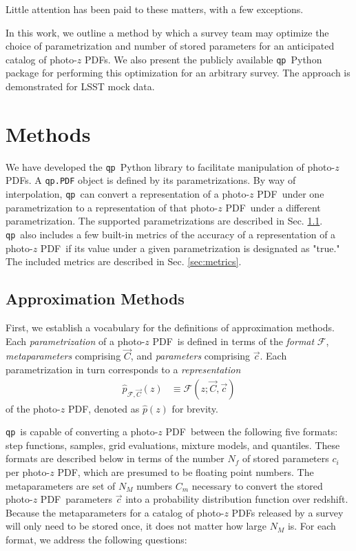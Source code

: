 \documentclass[\docopts]{\docclass}
\newcommand{\qp}{\texttt{qp}}
\newcommand{\pz}{photo-$z$ PDF}
\begin{document}
Little attention has been paid to these matters, with a few exceptions.  
\citep{carrasco_kind_sparse_2014}

In this work, we outline a method by which a survey team may optimize the 
choice of parametrization and number of stored parameters for an anticipated 
catalog of \pz s.  We also present the publicly available \qp\ Python package 
for performing this optimization for an arbitrary survey.  The approach is 
demonstrated for LSST mock data.








\section{Methods}
\label{sec:methods}



We have developed the \qp\ Python library to facilitate manipulation of \pz s.  
A \texttt{qp.PDF} object is defined by its parametrizations.  By way of 
interpolation, \qp\ can convert a representation of a \pz\ under one 
parametrization to a representation of that \pz\ under a different 
parametrization.  The supported parametrizations are described in Sec. 
\ref{sec:approx}.  \qp\ also includes a few built-in metrics of the accuracy of 
a representation of a \pz\ if its value under a given parametrization is 
designated as "true."  The included metrics are described in Sec. 
\ref{sec:metrics}.

\subsection{Approximation Methods}
\label{sec:approx}


First, we establish a vocabulary for the definitions of approximation methods.  
Each \textit{parametrization} of a \pz\ is defined in terms of the 
\textit{format} $\mathcal{F}$, \textit{metaparameters} comprising $\vec{C}$, 
and \textit{parameters} comprising $\vec{c}$.  Each parametrization in turn 
corresponds to a \textit{representation}
\begin{align}
  \hat{p}_{\mathcal{F}, \vec{C}}(z) &\equiv \mathcal{F}(z;\vec{C}, \vec{c})
\end{align}
of the \pz, denoted as $\hat{p}(z)$ for brevity.

\qp\ is capable of converting a \pz\ between the following five formats: step 
functions, samples, grid evaluations, mixture models, and quantiles.  These 
formats are described below in terms of the number $N_{f}$ of stored parameters 
$c_{i}$ per \pz, which are presumed to be floating point numbers.  The 
metaparameters are set of $N_{M}$ numbers $C_{m}$ necessary to convert the 
stored \pz\ parameters $\vec{c}$ into a probability distribution function over 
redshift.  Because the metaparameters for a catalog of \pz s released by a 
survey will only need to be stored once, it does not matter how large $N_{M}$ 
is.  For each format, we address the following questions:
\end{document}
